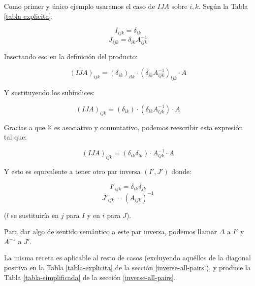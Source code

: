 Como primer y único ejemplo usaremos el caso de $IJA$ sobre $i, k$. Según la Tabla \ref{tabla-explicita}:

$$I_{ijk} = \delta_{ik}$$
$$J_{ijk} = \delta_{ik} A_{ijk}^{-1}$$

Insertando eso en la definición del producto:

$$(IJA)_{ijk} = (\delta_{ik})_{ilk} \cdot (\delta_{ik} A_{ijk}^{-1})_{ljk} \cdot A$$

Y sustituyendo los subíndices:

$$(IJA)_{ijk} = (\delta_{ik}) \cdot (\delta_{lk} A_{ljk}^{-1}) \cdot A$$

Gracias a que $\mathbb{K}$ es asociativo y conmutativo, podemos reescribir esta expresión tal que:

$$(IJA)_{ijk} = (\delta_{ik} \delta_{lk}) \cdot A_{ljk}^{-1} \cdot A$$

Y esto es equivalente a tener otro par inversa $(I', J')$ donde:

$$I'_{ijk} = \delta_{ik} \delta_{jk}$$
$$J'_{ijk} = (A_{ijk})^{-1}$$

($l$ se sustituiría en $j$ para $I$ y en $i$ para $J$).

Para dar algo de sentido semántico a este par inversa, podemos llamar $\Delta$ a $I'$ y $A^{-1}$ a $J'$.

La misma receta es aplicable al resto de casos (excluyendo aquéllos de la diagonal positiva en la Tabla \ref{tabla-explicita} de la sección \ref{inverse-all-pairs}), y produce la Tabla \ref{tabla-simplificada} de la sección \ref{inverse-all-pairs}.
